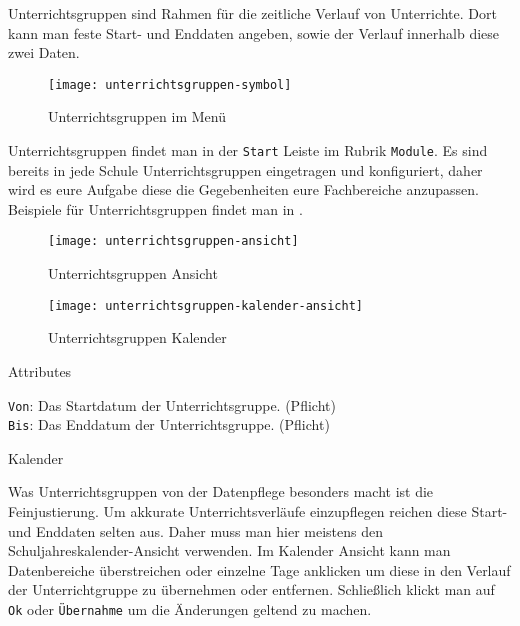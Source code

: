 \noindent
Unterrichtsgruppen sind Rahmen für die zeitliche Verlauf von Unterrichte. Dort kann man feste Start- und Enddaten angeben, sowie der Verlauf innerhalb diese zwei Daten.\\

\begin{wrapfigure}{r}{0.35\textwidth}
	\vspace{-14pt}
	\texttt{[image: unterrichtsgruppen-symbol]}
	\vspace{-5pt}
	\caption{Unterrichtsgruppen im Menü}
\end{wrapfigure}

\noindent
Unterrichtsgruppen findet man in der \texttt{Start} Leiste im Rubrik \texttt{Module}. Es sind bereits in jede Schule Unterrichtsgruppen eingetragen und konfiguriert, daher wird es eure Aufgabe diese die Gegebenheiten eure Fachbereiche anzupassen. Beispiele für Unterrichtsgruppen findet man in 
.\\


\begin{wrapfigure}{r}{0.35\textwidth}
	\vspace{-14pt}
	\label{fig:unterrichtsgruppen-symbol}
	\texttt{[image: unterrichtsgruppen-ansicht]}
	\vspace{-5pt}
	\caption{Unterrichtsgruppen Ansicht}
	\label{fig:unterrichtsgruppen-ansicht}
	\vspace{14pt}
	\texttt{[image: unterrichtsgruppen-kalender-ansicht]}
	\vspace{-5pt}
	\caption{Unterrichtsgruppen Kalender}
	\label{fig:unterrichtsgruppen-kalender-ansicht}
	\vspace{-25pt}
\end{wrapfigure}

\noindent
{\large Attributes\par}
\vspace{8pt}

\noindent
\texttt{Von}: Das Startdatum der Unterrichtsgruppe. (Pflicht)\\

\noindent
\texttt{Bis}: Das Enddatum der Unterrichtsgruppe. (Pflicht)\\

\noindent
{\large Kalender\par}
\vspace{8pt}

\noindent
Was Unterrichtsgruppen von der Datenpflege besonders macht ist die Feinjustierung. Um akkurate Unterrichtsverläufe einzupflegen reichen diese Start- und Enddaten selten aus. Daher muss man hier meistens den Schuljahreskalender-Ansicht verwenden. Im Kalender Ansicht kann man Datenbereiche überstreichen oder einzelne Tage anklicken um diese in den Verlauf der Unterrichtgruppe zu übernehmen oder entfernen. Schließlich klickt man auf \texttt{Ok} oder \texttt{Übernahme} um die Änderungen geltend zu machen.\\

